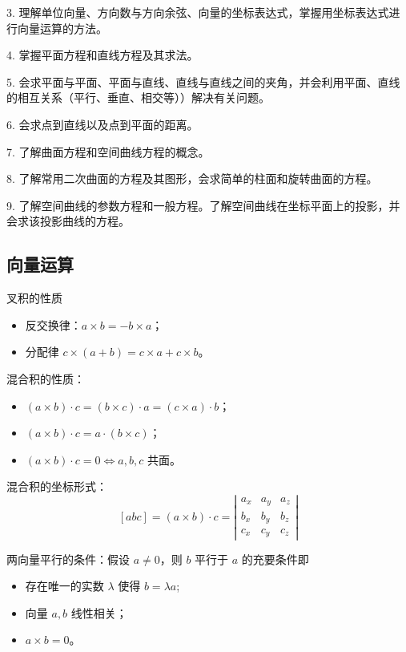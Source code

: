 3. 理解单位向量、方向数与方向余弦、向量的坐标表达式，掌握用坐标表达式进行向量运算的方法。

4. 掌握平面方程和直线方程及其求法。

5. 会求平面与平面、平面与直线、直线与直线之间的夹角，并会利用平面、直线的相互关系（平行、垂直、相交等））解决有关问题。

6. 会求点到直线以及点到平面的距离。

7. 了解曲面方程和空间曲线方程的概念。

8. 了解常用二次曲面的方程及其图形，会求简单的柱面和旋转曲面的方程。

9. 了解空间曲线的参数方程和一般方程。了解空间曲线在坐标平面上的投影，并会求该投影曲线的方程。

\subsection{向量运算}

叉积的性质
\begin{itemize}
	\item 反交换律：$a \times b = - b \times a$；
	\item 分配律 $c \times (a + b) = c \times a + c \times b$。
\end{itemize}

混合积的性质：
\begin{itemize}
	\item $(a \times b) \cdot c = (b \times c) \cdot a = (c \times a) \cdot b$；
	\item $(a \times b) \cdot c = a \cdot (b \times c)$；
	\item $(a \times b) \cdot c = 0 \Leftrightarrow a, b, c$ 共面。
\end{itemize}

混合积的坐标形式：
\[ [abc] = (a \times b) \cdot c = \left| \begin{matrix}
		a_x & a_y & a_z \\ b_x & b_y & b_z \\ c_x & c_y & c_z
	\end{matrix}\right| \]

两向量平行的条件：假设 $a \neq 0$，则 $b$ 平行于 $a$ 的充要条件即
\begin{itemize}
	\item 存在唯一的实数 $\lambda$ 使得 $b = \lambda a$;
	\item 向量 $a, b$ 线性相关；
	\item $a \times b = 0$。
\end{itemize}

